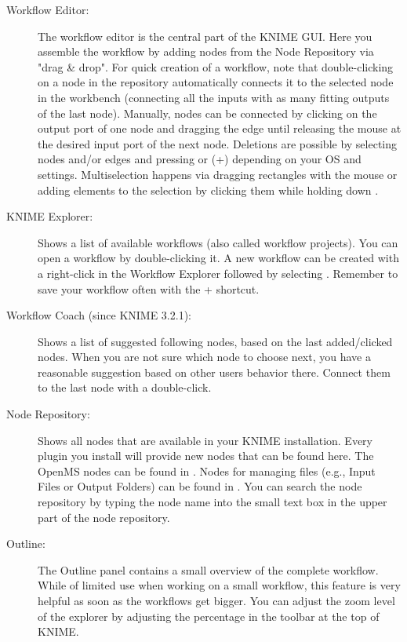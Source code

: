 \begin{description}
\item[Workflow Editor:]
The workflow editor is the central part of the KNIME GUI.
Here you assemble the workflow by adding nodes from the Node Repository via "drag \& drop". For quick creation of a 
workflow, note that double-clicking on 
a node in the repository automatically connects it to the selected node in the workbench (connecting all the inputs 
with as many fitting outputs of the last node).
Manually, nodes can be connected by clicking on the output port of one node and dragging the edge until releasing the 
mouse at the desired input port of the next node. Deletions are possible by selecting nodes and/or edges and pressing 
 or (+) depending on your OS and settings. Multiselection happens via dragging 
rectangles with the mouse or adding elements to the selection by clicking them while holding down .

\item[KNIME Explorer:]
Shows a list of available workflows (also called workflow projects).
You can open a workflow by double-clicking it.
A new workflow can be created with a right-click in the Workflow Explorer followed by selecting .
Remember to save your workflow often with the + shortcut.

\item[Workflow Coach (since KNIME 3.2.1):]
Shows a list of suggested following nodes, based on the last added/clicked nodes.
When you are not sure which node to choose next, you have a reasonable suggestion based on other users behavior 
there. Connect them to the last node with a double-click.

\item[Node Repository:]
Shows all nodes that are available in your KNIME installation.
Every plugin you install will provide new nodes that can be found here.
The OpenMS nodes can be found in .
Nodes for managing files (e.g., Input Files or Output Folders) can be found in .
You can search the node repository by typing the node name into the small text box in the upper part of the node repository.

\item[Outline:]
The Outline panel contains a small overview of the complete workflow. While of limited use when working on a small 
workflow, this feature is very helpful as soon as the workflows get bigger. You can adjust the zoom level of the 
explorer by adjusting the percentage in the toolbar at the top of KNIME.


\end{description}

